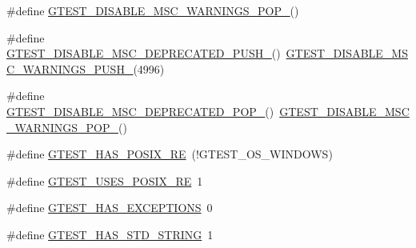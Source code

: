\begin{DoxyCompactItemize}
\item 
\#define \mbox{\hyperlink{_obj__test_2lib_2googletest-master_2googletest_2include_2gtest_2internal_2gtest-port_8h_ab4c44546d6d9aced68993b87b608fc06}{G\+T\+E\+S\+T\+\_\+\+D\+I\+S\+A\+B\+L\+E\+\_\+\+M\+S\+C\+\_\+\+W\+A\+R\+N\+I\+N\+G\+S\+\_\+\+P\+O\+P\+\_\+}}()
\item 
\#define \mbox{\hyperlink{_obj__test_2lib_2googletest-master_2googletest_2include_2gtest_2internal_2gtest-port_8h_a5b130138db254deaf29dbe3dffa1a2a8}{G\+T\+E\+S\+T\+\_\+\+D\+I\+S\+A\+B\+L\+E\+\_\+\+M\+S\+C\+\_\+\+D\+E\+P\+R\+E\+C\+A\+T\+E\+D\+\_\+\+P\+U\+S\+H\+\_\+}}()~\mbox{\hyperlink{_obj__test_2lib_2googletest-release-1_88_81_2googletest_2src_2gtest-internal-inl_8h_a88f79832f9d045112a76e9da8611cc13}{G\+T\+E\+S\+T\+\_\+\+D\+I\+S\+A\+B\+L\+E\+\_\+\+M\+S\+C\+\_\+\+W\+A\+R\+N\+I\+N\+G\+S\+\_\+\+P\+U\+S\+H\+\_\+}}(4996)
\item 
\#define \mbox{\hyperlink{_obj__test_2lib_2googletest-master_2googletest_2include_2gtest_2internal_2gtest-port_8h_aa0dc86dc9837f1610e91da65458f53b3}{G\+T\+E\+S\+T\+\_\+\+D\+I\+S\+A\+B\+L\+E\+\_\+\+M\+S\+C\+\_\+\+D\+E\+P\+R\+E\+C\+A\+T\+E\+D\+\_\+\+P\+O\+P\+\_\+}}()~\mbox{\hyperlink{_obj__test_2lib_2googletest-release-1_88_81_2googletest_2include_2gtest_2internal_2gtest-port_8h_ab4c44546d6d9aced68993b87b608fc06}{G\+T\+E\+S\+T\+\_\+\+D\+I\+S\+A\+B\+L\+E\+\_\+\+M\+S\+C\+\_\+\+W\+A\+R\+N\+I\+N\+G\+S\+\_\+\+P\+O\+P\+\_\+}}()
\item 
\#define \mbox{\hyperlink{_obj__test_2lib_2googletest-master_2googletest_2include_2gtest_2internal_2gtest-port_8h_af5c4295ea1d76f07f65934f659792431}{G\+T\+E\+S\+T\+\_\+\+H\+A\+S\+\_\+\+P\+O\+S\+I\+X\+\_\+\+RE}}~(!G\+T\+E\+S\+T\+\_\+\+O\+S\+\_\+\+W\+I\+N\+D\+O\+WS)
\item 
\#define \mbox{\hyperlink{_obj__test_2lib_2googletest-master_2googletest_2include_2gtest_2internal_2gtest-port_8h_acecef794eeb09598cd47da764271cb18}{G\+T\+E\+S\+T\+\_\+\+U\+S\+E\+S\+\_\+\+P\+O\+S\+I\+X\+\_\+\+RE}}~1
\item 
\#define \mbox{\hyperlink{_obj__test_2lib_2googletest-master_2googletest_2include_2gtest_2internal_2gtest-port_8h_aedcf220690e6589d0fc2bd3db768ea66}{G\+T\+E\+S\+T\+\_\+\+H\+A\+S\+\_\+\+E\+X\+C\+E\+P\+T\+I\+O\+NS}}~0
\item 
\#define \mbox{\hyperlink{_obj__test_2lib_2googletest-master_2googletest_2include_2gtest_2internal_2gtest-port_8h_adba1121430c11cee8ba0c74e8cf6aa40}{G\+T\+E\+S\+T\+\_\+\+H\+A\+S\+\_\+\+S\+T\+D\+\_\+\+S\+T\+R\+I\+NG}}~1
\item 

\end{DoxyCompactItemize}
